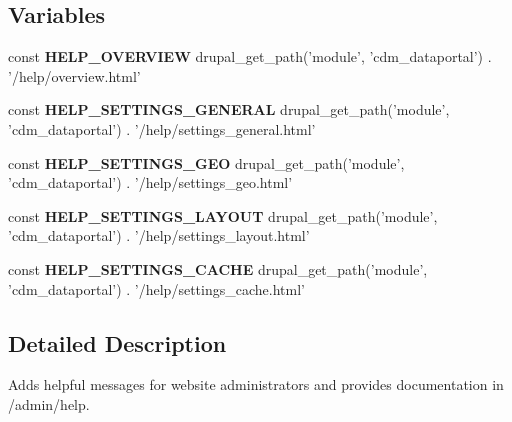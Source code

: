 \subsection*{Variables}
\begin{DoxyCompactItemize}
\item 
\hypertarget{help_8php_a78939c29241b4f076392d52b5283887a}{const {\bfseries H\-E\-L\-P\-\_\-\-O\-V\-E\-R\-V\-I\-E\-W} drupal\-\_\-get\-\_\-path('module', 'cdm\-\_\-dataportal') . '/help/overview.\-html'}\label{help_8php_a78939c29241b4f076392d52b5283887a}

\item 
\hypertarget{help_8php_aafbb7a326c8cf1c4329d958f422e7e7a}{const {\bfseries H\-E\-L\-P\-\_\-\-S\-E\-T\-T\-I\-N\-G\-S\-\_\-\-G\-E\-N\-E\-R\-A\-L} drupal\-\_\-get\-\_\-path('module', 'cdm\-\_\-dataportal') . '/help/settings\-\_\-general.\-html'}\label{help_8php_aafbb7a326c8cf1c4329d958f422e7e7a}

\item 
\hypertarget{help_8php_ae409a49b72393140e099cff95bb836a6}{const {\bfseries H\-E\-L\-P\-\_\-\-S\-E\-T\-T\-I\-N\-G\-S\-\_\-\-G\-E\-O} drupal\-\_\-get\-\_\-path('module', 'cdm\-\_\-dataportal') . '/help/settings\-\_\-geo.\-html'}\label{help_8php_ae409a49b72393140e099cff95bb836a6}

\item 
\hypertarget{help_8php_aa76d020ded4d733d4300c70c2052b7c4}{const {\bfseries H\-E\-L\-P\-\_\-\-S\-E\-T\-T\-I\-N\-G\-S\-\_\-\-L\-A\-Y\-O\-U\-T} drupal\-\_\-get\-\_\-path('module', 'cdm\-\_\-dataportal') . '/help/settings\-\_\-layout.\-html'}\label{help_8php_aa76d020ded4d733d4300c70c2052b7c4}

\item 
\hypertarget{help_8php_a6f3bc265d3a99d50493e2a263f0ca92d}{const {\bfseries H\-E\-L\-P\-\_\-\-S\-E\-T\-T\-I\-N\-G\-S\-\_\-\-C\-A\-C\-H\-E} drupal\-\_\-get\-\_\-path('module', 'cdm\-\_\-dataportal') . '/help/settings\-\_\-cache.\-html'}\label{help_8php_a6f3bc265d3a99d50493e2a263f0ca92d}

\end{DoxyCompactItemize}


\subsection{Detailed Description}
Adds helpful messages for website administrators and provides documentation in /admin/help. 

